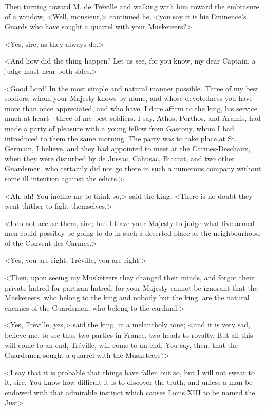Then turning toward M. de Tréville and walking with him toward the embrasure of a window, <Well, monsieur,> continued he, <you say it is his Eminence's Guards who have sought a quarrel with your Musketeers?> 

<Yes, sire, as they always do.> 

<And how did the thing happen? Let us see, for you know, my dear Captain, a judge must hear both sides.> 

<Good Lord! In the most simple and natural manner possible. Three of my best soldiers, whom your Majesty knows by name, and whose devotedness you have more than once appreciated, and who have, I dare affirm to the king, his service much at heart---three of my best soldiers, I say, Athos, Porthos, and Aramis, had made a party of pleasure with a young fellow from Gascony, whom I had introduced to them the same morning. The party was to take place at St. Germain, I believe, and they had appointed to meet at the Carmes-Deschaux, when they were disturbed by de Jussac, Cahusac, Bicarat, and two other Guardsmen, who certainly did not go there in such a numerous company without some ill intention against the edicts.> 

<Ah, ah! You incline me to think so,> said the king. <There is no doubt they went thither to fight themselves.> 

<I do not accuse them, sire; but I leave your Majesty to judge what five armed men could possibly be going to do in such a deserted place as the neighbourhood of the Convent des Carmes.> 

<Yes, you are right, Tréville, you are right!> 

<Then, upon seeing my Musketeers they changed their minds, and forgot their private hatred for partisan hatred; for your Majesty cannot be ignorant that the Musketeers, who belong to the king and nobody but the king, are the natural enemies of the Guardsmen, who belong to the cardinal.> 

<Yes, Tréville, yes,> said the king, in a melancholy tone; <and it is very sad, believe me, to see thus two parties in France, two heads to royalty. But all this will come to an end, Tréville, will come to an end. You say, then, that the Guardsmen sought a quarrel with the Musketeers?> 

<I say that it is probable that things have fallen out so, but I will not swear to it, sire. You know how difficult it is to discover the truth; and unless a man be endowed with that admirable instinct which causes Louis XIII to be named the Just\longdash> 

